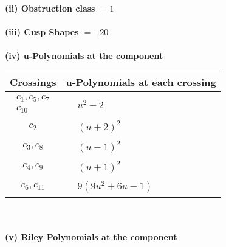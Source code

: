 \documentclass[1p]{elsarticle_modified}
\theoremstyle{definition}
\begin{document}
\flushleft \textbf{(ii) Obstruction class $= 1$}\\~\\
\flushleft \textbf{(iii) Cusp Shapes $= -20$}\\~\\
\newpage\renewcommand{\arraystretch}{1}
\flushleft \textbf{(iv) u-Polynomials at the component}\newline \\
\begin{tabular}{m{50pt}|m{274pt}}
Crossings & \hspace{64pt}u-Polynomials at each crossing \\
\hline $$\begin{aligned}c_{1},c_{5},c_{7}\\c_{10}\end{aligned}$$&$\begin{aligned}
&u^2-2
\end{aligned}$\\
\hline $$\begin{aligned}c_{2}\end{aligned}$$&$\begin{aligned}
&(u+2)^2
\end{aligned}$\\
\hline $$\begin{aligned}c_{3},c_{8}\end{aligned}$$&$\begin{aligned}
&(u-1)^2
\end{aligned}$\\
\hline $$\begin{aligned}c_{4},c_{9}\end{aligned}$$&$\begin{aligned}
&(u+1)^2
\end{aligned}$\\
\hline $$\begin{aligned}c_{6},c_{11}\end{aligned}$$&$\begin{aligned}
&9(9 u^2+6 u-1)
\end{aligned}$\\
\hline
\end{tabular}\\~\\
\newpage\renewcommand{\arraystretch}{1}
\flushleft \textbf{(v) Riley Polynomials at the component}\newline \\
\end{document}
